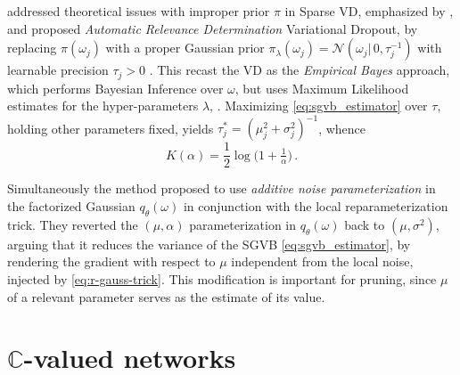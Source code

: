 \documentclass{article}
\newcommand{\cplx}{\mathbb{C}}
\begin{document}
\citet{kharitonov_variational_2018} addressed theoretical issues with improper prior
$\pi$ in Sparse VD, emphasized by \citet{hron_variational_2018}, and proposed
\emph{Automatic Relevance Determination} Variational Dropout, by replacing $\pi(\omega_j)$
with a proper Gaussian prior $
  \pi_\lambda(\omega_j) = \mathcal{N}(\omega_j \vert\, 0, \tau_j^{-1})
$ with learnable precision $\tau_j > 0$ \citep{neal_bayesian_1996}. This recast the VD
as the \emph{Empirical Bayes} approach, which performs Bayesian Inference over $\omega$,
but uses Maximum Likelihood estimates for the hyper-parameters $\lambda$,
\citep{mackay_bayesian_1994}. Maximizing \eqref{eq:sgvb_estimator} over $\tau$, holding
other parameters fixed, yields $
  \tau^*_j = {(\mu_j^2 + \sigma^2_j)}^{-1}
$, whence
\begin{equation}  \label{eq:ard-kl-div-real}
  K(\alpha)
    = \frac12 \log{\bigl(1 + \tfrac1{\alpha} \bigr)}
    \,.
\end{equation}


Simultaneously the method \citet{molchanov_variational_2017} proposed to use \emph{additive
noise parameterization} in the factorized Gaussian $q_\theta(\omega)$ in conjunction with
the local reparameterization trick. They reverted the $(\mu, \alpha)$ parameterization in
$q_\theta(\omega)$ back to $(\mu, \sigma^2)$, arguing that it reduces the variance of the
SGVB \eqref{eq:sgvb_estimator}, by rendering the gradient with respect to $\mu$ independent
from the local noise, injected by \eqref{eq:r-gauss-trick}. This modification is important
for pruning, since $\mu$ of a relevant parameter serves as the estimate of its value.




\section{$\cplx$-valued networks} %
\label{sec:c_valued_networks}
\end{document}
